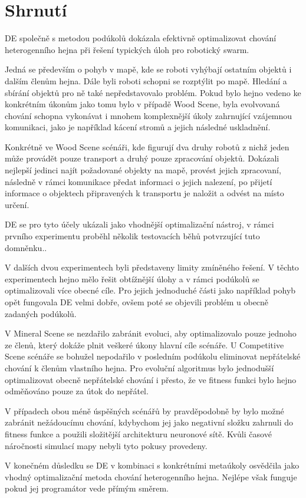 \section{Shrnutí}
DE společně s metodou podúkolů dokázala efektivně optimalizovat chování heterogenního hejna při řešení typických úloh pro robotický swarm. 
\par 
Jedná se především o pohyb v mapě, kde se roboti vyhýbají ostatním objektů i dalším členům hejna. Dále byli roboti schopni se rozptýlit po mapě. Hledání a sbírání objektů pro ně také nepředstavovalo problém. Pokud bylo hejno vedeno ke konkrétním úkonům jako tomu bylo v případě Wood Scene, byla evolvovaná chování schopna vykonávat i mnohem komplexnější úkoly zahrnující vzájemnou komunikaci, jako je například kácení stromů a jejich následné uskladnění. \par 
Konkrétně ve Wood Scene scénáři, kde figurují dva druhy robotů z nichž jeden může provádět pouze transport a druhý pouze zpracování objektů. Dokázali nejlepší jedinci najít požadované objekty na mapě, provést jejich zpracovaní, následně v rámci komunikace předat informaci o jejich nalezení, po přijetí informace o objektech připravených k transportu je naložit a odvést na místo určení.   
\par
DE se pro tyto účely ukázali jako vhodnější optimalizační nástroj, v rámci prvního experimentu proběhl několik testovacích běhů potvrzující tuto domněnku.. 
\par
V dalších dvou experimentech byli představeny limity zmíněného řešení. V těchto experimentech hejno mělo řešit obtížnější úlohy a v rámci podúkolů se optimalizovali více obecné cíle. Pro jejich jednoduché části jako například pohyb opět fungovala DE velmi dobře, ovšem poté se objevili problém u obecně zadaných podúkolů. 
\par 
V Mineral Scene se nezdařilo zabránit evoluci, aby optimalizovalo pouze jednoho ze členů, který dokáže plnit veškeré úkony hlavní cíle scénáře. U Competitive Scene scénáře se bohužel nepodařilo v posledním podúkolu eliminovat nepřátelské chování k členům vlastního hejna. Pro evoluční algoritmus bylo jednodušší optimalizovat obecně nepřátelské chování i přesto, že ve fitness funkci bylo hejno odměňováno pouze za útok do nepřátel. 
\par 
V případech obou méně úspěšných scénářů by pravděpodobně by bylo možné zabránit nežádoucímu chování, kdybychom jej jako negativní složku zahrnuli do fitness funkce a použili složitější architekturu neuronové sítě. Kvůli časové náročnosti simulací mapy nebyli tyto pokusy provedeny. 
\par
V konečném důsledku se DE v kombinaci s konkrétními metaúkoly osvědčila jako vhodný optimalizační metoda chování heterogenního hejna. Nejlépe však funguje pokud jej programátor vede přímým směrem. 